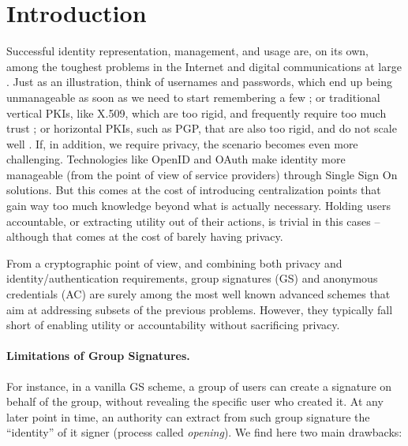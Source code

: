 \section{Introduction}
\label{sec:introduction}

Successful identity representation, management, and usage are, on its own, among
the toughest problems in the Internet and digital communications at large
\needcite. Just as an illustration, think
of usernames and passwords, which end up being unmanageable as soon as we need
to start remembering a few \needcite; or traditional vertical PKIs, like X.509,
which are too rigid, and frequently require too much trust \needcite; or
horizontal PKIs, such as PGP, that are also too rigid, and do not scale well
\needcite. If, in addition, we require privacy, the scenario becomes even more
challenging. Technologies like OpenID and OAuth \needcite make identity more
manageable (from the point of view of service providers) through Single Sign
On solutions. But this comes at the cost of introducing centralization points
that gain way too much knowledge beyond what is actually necessary. Holding
users accountable, or extracting utility out of their actions, is trivial in
this cases -- although that comes at the cost of barely having privacy.


From a cryptographic point of view, and combining both privacy and
identity/authentication requirements, group signatures (GS) and anonymous
credentials (AC) are surely among the most well known advanced schemes that
aim at addressing subsets of the previous problems. However, they typically fall
short of enabling utility or accountability without sacrificing privacy.

\paragraph{Limitations of Group Signatures.} %
For instance, in a vanilla GS scheme, a group of users can create a signature on
behalf of the group, without revealing the specific user who created it. At any
later point in time, an authority can extract from such group signature the
``identity'' of it signer (process called \emph{opening}). We find here two main
drawbacks:


